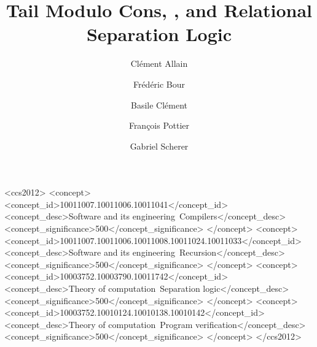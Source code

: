 \documentclass[acmsmall,screen]{acmart} %
\begin{document}

\title{Tail Modulo Cons, \OCaml, and Relational Separation Logic}

\author{Clément Allain}

\author{Frédéric Bour}

\author{Basile Clément}

\author{François Pottier}

\author{Gabriel Scherer}

\begin{CCSXML}
<ccs2012>
   <concept>
       <concept_id>10011007.10011006.10011041</concept_id>
       <concept_desc>Software and its engineering~Compilers</concept_desc>
       <concept_significance>500</concept_significance>
       </concept>
   <concept>
       <concept_id>10011007.10011006.10011008.10011024.10011033</concept_id>
       <concept_desc>Software and its engineering~Recursion</concept_desc>
       <concept_significance>500</concept_significance>
       </concept>
   <concept>
       <concept_id>10003752.10003790.10011742</concept_id>
       <concept_desc>Theory of computation~Separation logic</concept_desc>
       <concept_significance>500</concept_significance>
       </concept>
   <concept>
       <concept_id>10003752.10010124.10010138.10010142</concept_id>
       <concept_desc>Theory of computation~Program verification</concept_desc>
       <concept_significance>500</concept_significance>
       </concept>
 </ccs2012>
\end{CCSXML}

\end{document}
